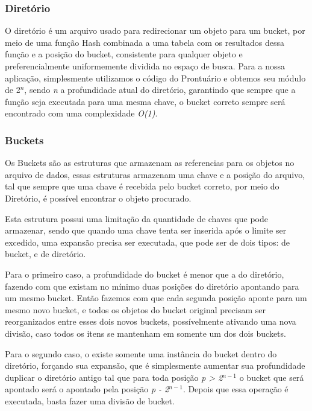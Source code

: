 \subsubsection{\esp Diretório}
\label{dir}
O diretório é um arquivo usado para redirecionar um objeto para um bucket, por meio de uma função Hash combinada a uma tabela com os resultados dessa função e a posição do bucket, consistente para qualquer objeto e preferencialmente uniformemente dividida no espaço de busca. Para a nossa aplicação, simplesmente utilizamos o código do Prontuário e obtemos seu módulo de 2$^n$, sendo \textit{n} a profundidade atual do diretório, garantindo que sempre que a função seja executada para uma mesma chave, o bucket correto sempre será encontrado com uma complexidade \textit{O(1)}.

\subsubsection{\esp Buckets}
Os Buckets são as estruturas que armazenam as referencias para os objetos no arquivo de dados, essas estruturas armazenam uma chave e a posição do arquivo, tal que sempre que uma chave é recebida pelo bucket correto, por meio do Diretório, é possível encontrar o objeto procurado. 

Esta estrutura possui uma limitação da quantidade de chaves que pode armazenar, sendo que quando uma chave tenta ser inserida após o limite ser excedido, uma expansão precisa ser executada, que pode ser de dois tipos: de bucket, e de diretório. 

Para o primeiro caso, a profundidade do bucket é menor que a do diretório, fazendo com que existam no mínimo duas posições do diretório apontando para um mesmo bucket. Então fazemos com que cada segunda posição aponte para um mesmo novo bucket, e todos os objetos do bucket original precisam ser reorganizados entre esses dois novos buckets, possívelmente ativando uma nova divisão, caso todos os itens se mantenham em somente um dos dois buckets.

Para o segundo caso, o existe somente uma instância do bucket dentro do diretório, forçando sua expansão, que é simplesmente aumentar sua profundidade duplicar o diretório antigo tal que para toda posição \textit{p > 2$^{n-1}$} o bucket que será apontado será o apontado pela posição \textit{p - 2$^{n-1}$}. Depois que essa operação é executada, basta fazer uma divisão de bucket.